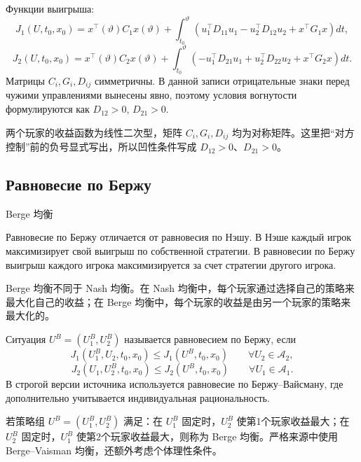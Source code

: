 \documentclass[12pt,a4paper]{article}
\newcommand{\zh}[1]{\par\noindent #1\par}
\begin{document}
Функции выигрыша:
\[
J_1(U,t_0,x_0)=x^{\top}(\vartheta)C_1x(\vartheta)+
\int_{t_0}^{\vartheta}\left(u_1^{\top}D_{11}u_1-u_2^{\top}D_{12}u_2+x^{\top}G_1x\right)dt,
\]
\[
J_2(U,t_0,x_0)=x^{\top}(\vartheta)C_2x(\vartheta)+
\int_{t_0}^{\vartheta}\left(-u_1^{\top}D_{21}u_1+u_2^{\top}D_{22}u_2+x^{\top}G_2x\right)dt.
\]
Матрицы \(C_i,G_i,D_{ij}\) симметричны. В данной записи отрицательные знаки перед чужими управлениями вынесены явно, поэтому условия вогнутости формулируются как \(D_{12}>0\), \(D_{21}>0\).
\zh{两个玩家的收益函数为线性二次型，矩阵 \(C_i,G_i,D_{ij}\) 均为对称矩阵。这里把“对方控制”前的负号显式写出，所以凹性条件写成 \(D_{12}>0\)、\(D_{21}>0\)。}


\subsection*{Равновесие по Бержу}
\zh{Berge 均衡}
Равновесие по Бержу отличается от равновесия по Нэшу. В Нэше каждый игрок максимизирует свой выигрыш по собственной стратегии. В равновесии по Бержу выигрыш каждого игрока максимизируется за счет стратегии другого игрока.
\zh{Berge 均衡不同于 Nash 均衡。在 Nash 均衡中，每个玩家通过选择自己的策略来最大化自己的收益；在 Berge 均衡中，每个玩家的收益是由另一个玩家的策略来最大化的。}

Ситуация \(U^B=(U_1^B,U_2^B)\) называется равновесием по Бержу, если
\[
J_1(U_1^B,U_2,t_0,x_0)\le J_1(U^B,t_0,x_0)
\qquad \forall U_2\in\mathcal A_2,
\]
\[
J_2(U_1,U_2^B,t_0,x_0)\le J_2(U^B,t_0,x_0)
\qquad \forall U_1\in\mathcal A_1.
\]
В строгой версии источника используется равновесие по Бержу--Вайсману, где дополнительно учитывается индивидуальная рациональность.
\zh{若策略组 \(U^B=(U_1^B,U_2^B)\) 满足：在 \(U_1^B\) 固定时，\(U_2^B\) 使第1个玩家收益最大；在 \(U_2^B\) 固定时，\(U_1^B\) 使第2个玩家收益最大，则称为 Berge 均衡。严格来源中使用 Berge--Vaisman 均衡，还额外考虑个体理性条件。}

\end{document}
